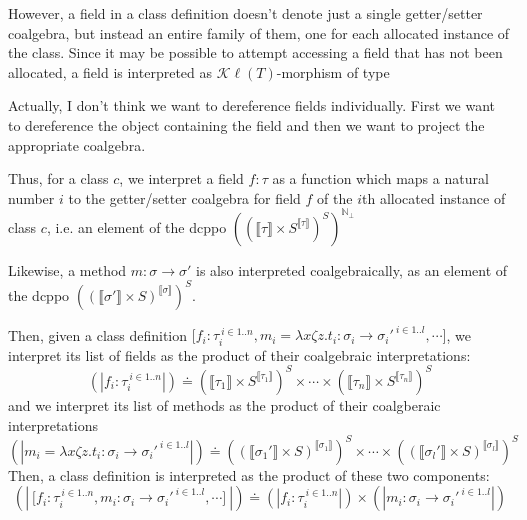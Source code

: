 \documentclass{article}
\newcommand{\sem}[1]{\llbracket #1 \rrbracket}
\newcommand{\csem}[1]{( \! | #1 | \! )}
\begin{document}
However, a field in a class definition doesn't denote just a single 
getter/setter coalgebra, but instead an entire family of them, one for each allocated instance of the class.
Since it may be possible to attempt accessing a field that has not been allocated, a field is interpreted as 
$\mathcal K \ell(T)$-morphism of type 
\begin{center}
\end{center} 

Actually, I don't think we want to dereference fields individually. First we want to dereference the object containing
the field and then we want to project the appropriate coalgebra.

Thus, for a class $c$, 
we interpret a field $f : \tau$ as a function which maps a natural number $i$ to the getter/setter coalgebra 
for field $f$ of the 
$i$th allocated instance of class $c$, i.e. an element of the dcppo $((\sem{\tau} \times S^{\sem{\tau}})^S)^{\mathbb N_{\bot}}$ 

Likewise, a method $m : \sigma \to \sigma'$ is also interpreted coalgebraically, as an element of the dcppo
$((\sem{\sigma'} \times S)^{\sem{\sigma}})^S$.

Then, given a class definition 
$\lbrack f_i:\tau_i^{~i \in 1..n}, m_i = \lambda x \zeta z. t_i :\sigma_i \to \sigma_i'^{~i \in 1..l}, \cdots \rbrack$, we interpret its list of fields 
as the product of their coalgebraic interpretations:
$$\csem{f_i : \tau_i^{~i \in 1..n}} \doteq (\sem{\tau_1} \times S^{\sem{\tau_1}})^S \times \cdots \times (\sem{\tau_n} \times S^{\sem{\tau_n}})^S$$
and we interpret its list of methods as the product of their coalgberaic interpretations
$$\csem{m_i = \lambda x \zeta z. t_i : \sigma_i \to \sigma_i'^{~i \in 1..l}} \doteq ((\sem{\sigma_1'} \times S)^{\sem{\sigma_1}})^S \times \cdots \times ((\sem{\sigma_l'} \times S)^{\sem{\sigma_l}})^S$$
Then, a class definition is interpreted as the product of these two components:
$$ \csem{~\lbrack f_i:\tau_i^{~i \in 1..n}, m_i:\sigma_i \to \sigma_i'^{~i \in 1..l}, \cdots \rbrack~} \doteq 
  \csem{f_i : \tau_i^{~i \in 1..n}} \times \csem{m_i : \sigma_i \to \sigma_i'^{~i \in 1..l}} $$

\fi
\end{document}
